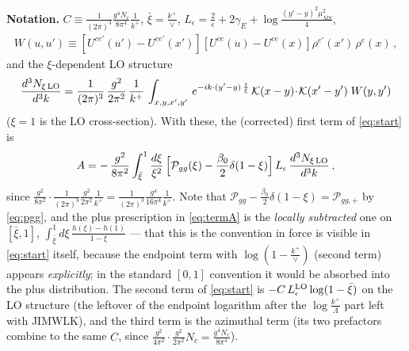 \documentclass[10pt]{article}
\newcommand{\Leps}{L_{\epsilon}}
\newcommand{\KK}{\mathcal K(x-y)\!\cdot\!\mathcal K(x'-y')}
\begin{document}
\textbf{Notation.} $C\equiv\frac{1}{(2\pi)^{3}}\frac{g^{4}N_{c}}{8\pi^{4}}\frac{1}{k^{+}}$,
$\bar\xi=\frac{k^{+}}{\vee}$,
$\Leps=\frac{2}{\epsilon}+2\gamma_{E}+\log\frac{(y'-y)^{2}\mu^{2}_{\overline{MS}}}{4}$,
\begin{align}
W(u,u')\equiv\left[U^{ce'}(u')-U^{ce'}(x')\right]\left[U^{ce}(u)-U^{ce}(x)\right]\rho^{e'}(x')\,\rho^{e}(x)\,,
\end{align}
and the $\xi$-dependent LO structure
\begin{align}\label{eq:dnxilo}
\frac{d^{3}N_{\xi\,\rm LO}}{d^{3}k} = \frac{1}{(2\pi)^{3}}\, \frac{g^{2}}{2\pi^{2}}\, \frac{1}{k^{+}}\,\int_{x,y,x',y'}\, e^{-ik\cdot (y'-y)\,\frac{1}{\xi}}\, \KK\;W(y,y')
\end{align}
($\xi=1$ is the LO cross-section). With these, the (corrected) first term of \eqref{eq:start} is
\begin{align}\label{eq:termA}
A=-\,\frac{g^{2}}{8\pi^{2}}\int_{\bar\xi}^{1}\frac{d\xi}{\xi^{2}}\,
\Big[\mathcal P_{gg}(\xi)-\frac{\beta_{0}}{2}\delta(1-\xi)\Big]\,\Leps\,
\frac{d^{3}N_{\xi\,\rm LO}}{d^{3}k}\,,
\end{align}
since $\frac{g^{2}}{8\pi^{2}}\cdot\frac{1}{(2\pi)^{3}}\frac{g^{2}}{2\pi^{2}}\frac{1}{k^{+}}
=\frac{1}{(2\pi)^{3}}\frac{g^{4}}{16\pi^{4}}\frac{1}{k^{+}}$. Note that
$\mathcal P_{gg}-\frac{\beta_{0}}{2}\delta(1-\xi)=\mathcal P_{gg,+}$ by \eqref{eq:pgg}, and the
plus prescription in \eqref{eq:termA} is the \emph{locally subtracted} one on $[\bar\xi,1]$,
$\int_{\bar\xi}^{1}d\xi\,\frac{h(\xi)-h(1)}{1-\xi}$ --- that this is the convention in force is
visible in \eqref{eq:start} itself, because the endpoint term with
$\log(1-\frac{k^{+}}{\vee})$ (second term) appears \emph{explicitly}; in the standard $[0,1]$
convention it would be absorbed into the plus distribution. The second term of
\eqref{eq:start} is $-C\,\Leps^{\rm LO}\log(1-\bar\xi)$ on the LO structure (the leftover of
the endpoint logarithm after the $\log\frac{k^{+}}{\Lambda}$ part left with JIMWLK), and the
third term is the azimuthal term (its two prefactors combine to the same $C$, since
$\frac{g^{2}}{4\pi^{2}}\cdot\frac{g^{2}}{2\pi^{2}}N_{c}=\frac{g^{4}N_{c}}{8\pi^{4}}$).
\end{document}
